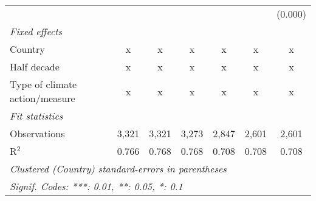 \begin{tabular}{lcccccc}
                                               &               &               &               &              &               & (0.000)\\   
   \emph{Fixed effects}\\
   Country                                     & x             & x             & x             & x            & x             & x\\  
   Half decade                                 & x             & x             & x             & x            & x             & x\\  
   Type of climate action/measure              & x             & x             & x             & x            & x             & x\\  
   \midrule \emph{Fit statistics}\\
   Observations                                & 3,321         & 3,321         & 3,273         & 2,847        & 2,601         & 2,601\\  
   R$^2$                                       & 0.766         & 0.768         & 0.768         & 0.708        & 0.708         & 0.708\\  
   \midrule
   \multicolumn{7}{l}{\emph{Clustered (Country) standard-errors in parentheses}}\\
   \multicolumn{7}{l}{\emph{Signif. Codes: ***: 0.01, **: 0.05, *: 0.1}}\\
\end{tabular}
\par\endgroup


